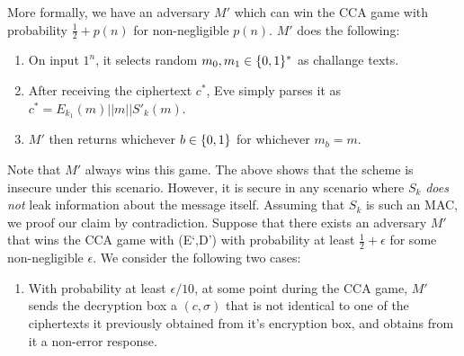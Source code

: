 \documentclass{article}
\begin{document}
\begin{enumerate}[,start=2]
\begin{enumerate}[,label=\alph*.]
\begin{mdbmarginx}{1ex}{0pt}{1ex}{0pt}
More formally, we have an adversary $M'$ which can win the CCA game with probability $\frac{1}{2} + p(n)$
for non-negligible $p(n)$. $M'$ does the following:%

\begin{enumerate}[noitemsep,topsep=\mdcompacttopsep]%

\item{}On input $1^n$, it selects random $m_0,m_1 \in \{0,1\}^*$ as challange texts.%

\item{}After receiving the ciphertext $c^*$, Eve simply parses it as $c^* = E_{k_1}(m) || m || S'_k(m)$.%

\item{}$M'$ then returns whichever $b \in \{0,1\}$ for whichever $m_b = m$.%
\end{enumerate}%

\noindent{}Note that $M'$ always wins this game. 
The above shows that the scheme is insecure under this scenario. However, it is secure in any
scenario where $S_k$ \emph{does not} leak information about the message itself. Assuming that $S_k$ is
such an MAC, we proof our claim by contradiction. Suppose that there exists an
adversary $M'$ that wins the CCA game with (E\textquoteleft{},D\textquoteright{}) with probability at least $\frac{1}{2} + \epsilon$
for some non-negligible $\epsilon$. We consider the following two cases:%

\begin{enumerate}[noitemsep,topsep=\mdcompacttopsep]%

\item{}With probability at least $\epsilon /10$, at some point during the CCA game, $M'$ sends the 
decryption box a $(c,\sigma)$ that is not identical to one of the ciphertexts it previously 
obtained from it's encryption box, and obtains from it a non-error response.%


\end{enumerate}
\end{mdbmarginx}
\end{enumerate}
\end{enumerate}
\end{document}
